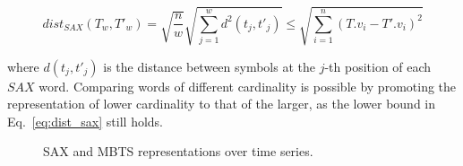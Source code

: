 \begin{equation} \label{eq:dist_sax}
dist_{SAX}(T_w, T'_w) =\sqrt{\frac{n}{w}} \sqrt{\sum_{j=1}^{w} d^2(t_j, t'_j) }  \leq {\sqrt{\displaystyle \sum_{i=1}^{n}(T.v_i - T'.v_i)^2}}
\end{equation}

\noindent where $d(t_j, t'_j)$ is the distance between symbols at the $j$-th position of each $SAX$ word. Comparing \isax words of different cardinality is possible by promoting the \isax representation of lower cardinality to that of the larger, as the lower bound in Eq.~\ref{eq:dist_sax} still holds.

\begin{figure}[!t]
 \centering
\caption{SAX and MBTS representations over time series.}
\label{fig:isax_example}
\end{figure}

